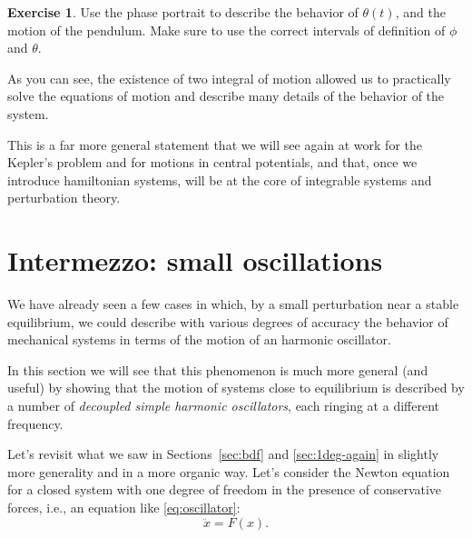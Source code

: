 \documentclass[english,fontsize=11pt,paper=b5]{scrbook}
\theoremstyle{definition}
\newtheorem{exercise}{Exercise}[chapter]
\begin{document}
    \begin{exercise}
      Use the phase portrait to describe the behavior of $\theta(t)$, and the motion of the pendulum. Make sure to use the correct intervals of definition of $\phi$ and $\theta$.
    \end{exercise}

    As you can see, the existence of two integral of motion allowed us to practically solve the equations of motion and describe many details of the behavior of the system.

    This is a far more general statement that we will see again at work for the Kepler's problem and for motions in central potentials, and that, once we introduce hamiltonian systems, will be at the core of integrable systems and perturbation theory.


    \section{Intermezzo: small oscillations}\label{sec:soc}
    We have already seen a few cases in which, by a small perturbation near a stable equilibrium, we could describe with various degrees of accuracy the behavior of mechanical systems in terms of the motion of an harmonic oscillator.

    In this section we will see that this phenomenon is much more general (and useful) by showing that the motion of systems close to equilibrium is described by a number of \emph{decoupled simple harmonic oscillators}, each ringing at a different frequency.

    Let's revisit what we saw in Sections~\ref{sec:bdf} and \ref{sec:1deg-again} in slightly more generality and in a more organic way. Let's consider the Newton equation for a closed system with one degree of freedom in the presence of conservative forces, i.e., an equation like \eqref{eq:oscillator}:
    \begin{equation}
      \ddot x = F(x).
    \end{equation}
\end{document}
